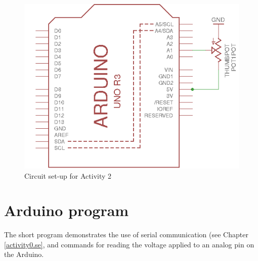 \documentclass[12pt]{book}
\begin{document}
\begin{figure}[tb]
	 \centering
	\includegraphics{schem/Experiment2}
	\caption{Circuit set-up for Activity 2}
	\label{fig:SchemEx3}
\end{figure}

\section{Arduino program}

The short program demonstrates the use of serial communication (see
Chapter \ref{activity0.se}, and commands for reading the voltage applied to an
analog pin on the Arduino.
\end{document}
